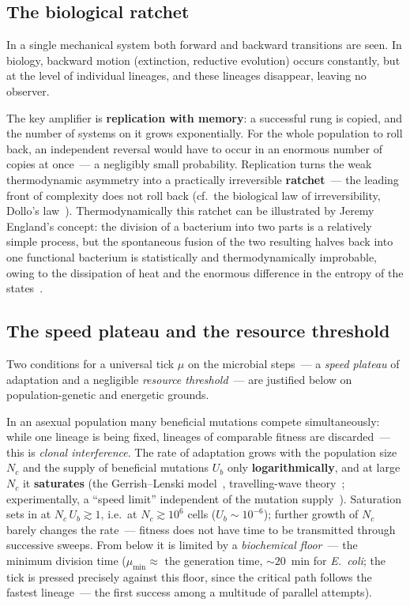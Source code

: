 \documentclass[11pt,a4paper]{article}
\begin{document}
\subsection{The biological ratchet}
\label{sec:ratchet}

In a single mechanical system both forward and backward transitions are seen. In biology, backward motion (extinction, reductive evolution) occurs constantly, but at the level of individual lineages, and these lineages disappear, leaving no observer.

The key amplifier is \textbf{replication with memory}: a successful rung is copied, and the number of systems on it grows exponentially. For the whole population to roll back, an independent reversal would have to occur in an enormous number of copies at once~--- a negligibly small probability. Replication turns the weak thermodynamic asymmetry into a practically irreversible \textbf{ratchet}~--- the leading front of complexity does not roll back (cf.~the biological law of irreversibility, Dollo's law~\cite{Dollo1893,Gould1970}). Thermodynamically this ratchet can be illustrated by Jeremy England's concept: the division of a bacterium into two parts is a relatively simple process, but the spontaneous fusion of the two resulting halves back into one functional bacterium is statistically and thermodynamically improbable, owing to the dissipation of heat and the enormous difference in the entropy of the states~\cite{England2013}.

\subsection{The speed plateau and the resource threshold}
\label{sec:resource_threshold}

Two conditions for a universal tick $\mu$ on the microbial steps~--- a \emph{speed plateau} of adaptation and a negligible \emph{resource threshold}~--- are justified below on population-genetic and energetic grounds.

In an asexual population many beneficial mutations compete simultaneously: while one lineage is being fixed, lineages of comparable fitness are discarded~--- this is \emph{clonal interference}. The rate of adaptation grows with the population size $N_c$ and the supply of beneficial mutations $U_b$ only \textbf{logarithmically}, and at large $N_c$ it \textbf{saturates} (the Gerrish--Lenski model~\cite{GerrishLenski1998}, travelling-wave theory~\cite{DesaiFisher2007,ParkKrug2007}; experimentally, a ``speed limit'' independent of the mutation supply~\cite{deVisser1999,Lang2013}). Saturation sets in at $N_c\,U_b \gtrsim 1$, i.e.\ at $N_c \gtrsim 10^{6}$ cells ($U_b \sim 10^{-6}$); further growth of $N_c$ barely changes the rate~--- fitness does not have time to be transmitted through successive sweeps. From below it is limited by a \emph{biochemical floor}~--- the minimum division time ($\mu_{\min}\approx$ the generation time, $\sim 20$~min for \emph{E.~coli}; the tick is pressed precisely against this floor, since the critical path follows the fastest lineage~--- the first success among a multitude of parallel attempts).
\end{document}

